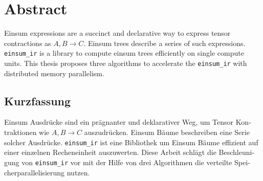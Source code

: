 \thispagestyle{empty} 

\section*{Abstract}

Einsum expressions are a succinct and declarative way to express tensor contractions as $A,B \rightarrow C$.
Einsum trees describe a series of such expressions.
\texttt{einsum\_ir} \cite{einsum_ir} is a library to compute einsum trees efficiently on single compute units.
This thesis proposes three algorithms to accelerate the \texttt{einsum\_ir} with distributed memory parallelism.

\thispagestyle{empty} 

\begin{otherlanguage}{ngerman}
\section*{Kurzfassung}
Einsum Ausdrücke sind ein prägnanter und deklarativer Weg, um Tensor Kontraktionen wie $A,B \rightarrow C$ auszudrücken.
Einsum Bäume beschreiben eine Serie solcher Ausdrücke.
\texttt{einsum\_ir} \cite{einsum_ir} ist eine Bibliothek um Einsum Bäume effizient auf einer einzelnen Recheneinheit auszuwerten.
Diese Arbeit schlägt die Beschleunigung von \texttt{einsum\_ir} vor mit der Hilfe von drei Algorithmen die verteilte Speicherparallelisierung nutzen.
\end{otherlanguage}
